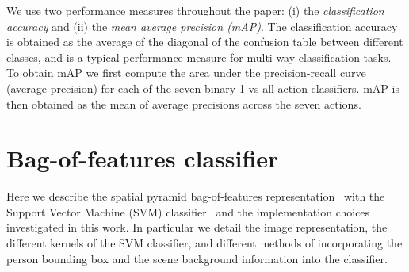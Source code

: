 \documentclass{bmvc2k}
\newcommand{\red}[1]{{\em \small \color{red} #1}} %
\newcommand{\secnspc}{\vspace*{-2mm}}
\begin{document}
We use two performance measures throughout the paper: (i) the {\em classification accuracy} and  (ii) the {\em mean average precision (mAP)}. The classification accuracy is obtained as the average of the diagonal of the confusion table between different classes, and is  a typical performance measure for multi-way classification tasks.
To obtain mAP we first compute the area under the precision-recall curve (average precision) for each of the seven binary 1-vs-all action classifiers. mAP is then obtained as the mean of average precisions across the seven actions.




\secnspc
\section{Bag-of-features classifier}
\secnspc
\label{sec:bof}

Here we describe the spatial pyramid bag-of-features representation~\cite{Lazebnik06} 
with the Support Vector Machine (SVM) classifier~\cite{Scholkopf} and the implementation choices investigated in this work.  In particular we detail the image representation, the different kernels of the SVM classifier, and
different methods of incorporating the person bounding box and the scene background information into the classifier. 
\end{document}
